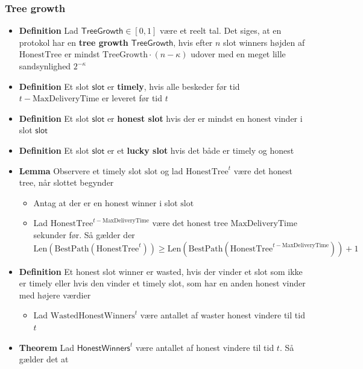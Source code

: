 \documentclass[a4, english]{article}
\begin{document}
\subsubsection{Tree growth}
\begin{itemize}
	\item \textbf{Definition} Lad $\mathsf{TreeGrowth} \in [0,1]$ være et reelt tal. Det siges, at en protokol har en \textbf{tree growth} $\mathsf{TreeGrowth}$, hvis efter $n$ slot winners højden af $\text{HonestTree}$ er mindst $\text{TreeGrowth} \cdot (n-\kappa)$ udover med en meget lille sandsynlighed $2^{-\kappa}$
  \item \textbf{Definition} Et slot $\mathsf{slot}$ er \textbf{timely}, hvis alle beskeder før tid $t-\text{MaxDeliveryTime}$ er leveret før tid $t$ 
  \item \textbf{Definition} Et slot $\mathsf{slot}$ er \textbf{honest slot} hvis der er mindst en honest vinder i slot $\mathsf{slot}$
	\item \textbf{Definition} Et slot $\mathsf{slot}$ er et \textbf{lucky slot} hvis det både er timely og honest 
  \item \textbf{Lemma} Observere et timely slot $\text{slot}$ og lad $\text{HonestTree}^t$ være det honest tree, når slottet begynder
  \begin{itemize}
  	\item Antag at der er en honest winner i slot $\text{slot}$
    \item Lad $\text{HonestTree}^{t-\text{MaxDeliveryTime}}$ være det honest tree $\text{MaxDeliveryTime}$ sekunder før. Så gælder der
  \begin{equation*}
    \text{Len}(\text{BestPath}(\text{HonestTree}^t)) \geq \text{Len}(\text{BestPath}(\text{HonestTree}^{t-\text{MaxDeliveryTime}})) + 1
  \end{equation*}
  \end{itemize}
  \item \textbf{Definition} Et honest slot winner er wasted, hvis der vinder et slot som ikke er timely eller hvis den vinder et timely slot, som har en anden honest vinder med højere værdier  
  \begin{itemize}
    \item Lad $\text{WastedHonestWinners}^t$ være antallet af waster honest vindere til tid $t$
  \end{itemize}
  \item \textbf{Theorem} Lad $\mathsf{HonestWinners}^t$ være antallet af honest vindere til tid $t$. Så gælder det at 
  \begin{equation*}

\end{equation*}
\end{itemize}
\end{document}
